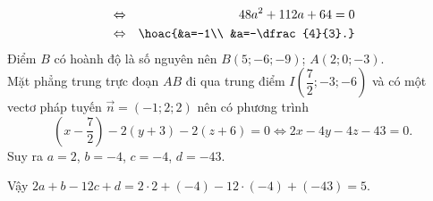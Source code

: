 \begin{ex}
{\begin{itemize}
\begin{eqnarray*}
			&\Leftrightarrow& 48a^2+112a+64=0
			\\
			&\Leftrightarrow&\hoac{&a=-1\\ &a=-\dfrac{4}{3}.}			
		\end{eqnarray*}
		Điểm $B$ có hoành độ là số nguyên nên $B(5;-6;-9)$; $A(2; 0;-3)$.\\
		Mặt phẳng trung trực đoạn $AB$ đi qua trung điểm $I\left(\dfrac{7}{2};-3;-6\right)$ và có một vectơ pháp tuyến $\vec{n}=(-1; 2; 2)$ nên có phương trình \[\left(x-\dfrac{7}{2}\right)-2(y+3)-2(z+6)=0\Leftrightarrow 2x-4y-4z-43=0.\]
		Suy ra $a=2$, $b=-4$, $c=-4$, $d=-43$.
	\end{itemize}
		Vậy $2a+b-12c+d=2\cdot 2+(-4)-12\cdot (-4)+(-43)=5$.
}
\end{ex}


